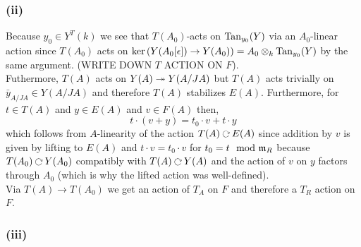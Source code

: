 \documentclass[12pt]{article}
\begin{document}
\subsubsection{(ii)}

Because $y_0 \in Y^T(k)$ we see that $T(A_0)$-acts on $\mathrm{Tan}_{y_0}(Y)$ via an $A_0$-linear action since $T(A_0)$ acts on $\ker{(Y(A_0[\epsilon]) \to Y(A_0))} = A_0 \otimes_k \mathrm{Tan}_{y_0}(Y)$ by the same argument. (WRITE DOWN $T$ ACTION ON $F$).
\bigskip\\
Futhermore, $T(A)$ acts on $Y(A) \twoheadrightarrow Y(A/JA)$ but $T(A)$ acts trivially on $\bar{y}_{A/JA} \in Y(A/JA)$ and therefore $T(A)$ stabilizes $E(A)$. Furthermore, for $t \in T(A)$ and $y \in E(A)$ and $v \in F(A)$ then,
\[ t \cdot (v + y) = t_0 \cdot v + t \cdot y \]
which follows from $A$-linearity of the action $T(A) \acts E(A)$ since addition by $v$ is given by lifting to $E(A)$ and $t \cdot v = t_0 \cdot v$ for $t_0 = t \mod {\mathfrak{m}}_R$ because $T(A_0) \acts Y(A_0)$ compatibly with $T(A) \acts Y(A)$ and the action of $v$ on $y$ factors through $A_0$ (which is why the lifted action was well-defined).
\bigskip\\
Via $T(A) \to T(A_0)$ we get an action of $T_A$ on $F$ and therefore a $T_R$ action on $F$.

\subsubsection{(iii)}
\end{document}
